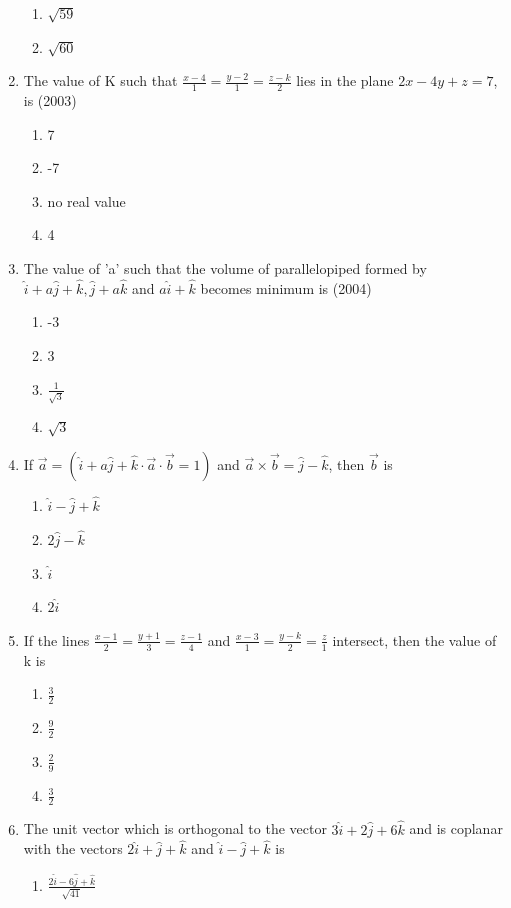 \documentclass[12pt]{article}
\providecommand{\brak}[1]{\ensuremath{\left(#1\right)}}
\begin{document}
\begin{enumerate}
\begin{enumerate}
\item $\sqrt{59}$
\item $\sqrt{60}$
\end{enumerate}
\item The value of K such that $\frac{x-4}{1}=\frac{y-2}{1}=\frac{z-k}{2}$ lies in the plane $2x-4y+z=7$, is   (2003)
\begin{enumerate}	
\item 7
\item -7
\item no real value
\item 4
\end{enumerate}
\item The value of 'a' such that the volume of parallelopiped formed by $\hat{i}+a\hat{j}+\hat{k},\hat{j}+a\hat{k}$ and $a\hat{i}+\hat{k}$ becomes minimum is (2004)
\begin{enumerate}	
\item -3
\item 3
\item $\frac{1}{\sqrt{3}}$
\item $\sqrt{3}$
\end{enumerate}
\item If $\vec{a}=\brak{\hat{i}+a\hat{j}+\hat{k}\cdot\vec{a}\cdot\vec{b}=1}$ and $\vec{a}\times\vec{b}=\hat{j}-\hat{k}$, then $\vec{b}$ is
\begin{enumerate}
\item $\hat{i}-\hat{j}+\hat{k}$
\item $2\hat{j}-\hat{k}$
\item $\hat{i}$
\item $2\hat{i}$
\end{enumerate}
\item If the lines $\frac{x-1}{2}=\frac{y+1}{3}=\frac{z-1}{4}$ and $\frac{x-3}{1}=\frac{y-k}{2}=\frac{z}{1}$ intersect, then the value of k is
\begin{enumerate}
\item $\frac{3}{2}$
\item $\frac{9}{2}$
\item $\frac{2}{9}$
\item $\frac{3}{2}$
\end{enumerate}
\item The unit vector which is orthogonal to the vector $3\hat{i}+2\hat{j}+6\hat{k}$ and is coplanar with the vectors $2\hat{i}+\hat{j}+\hat{k}$ and $\hat{i}-\hat{j}+\hat{k}$ is
\begin{enumerate}
\item $\frac{2\hat{i}-6\hat{j}+\hat{k}}{\sqrt{41}}$

\end{enumerate}
\end{enumerate}
\end{document}
